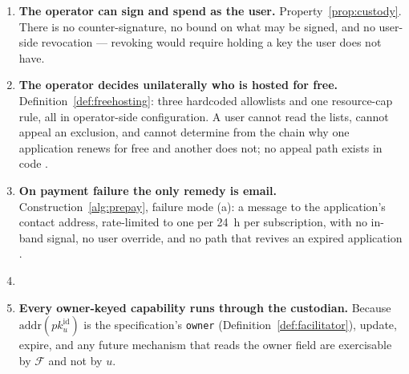 \begin{enumerate}\setlength{\itemsep}{2pt}
\item \textbf{The operator can sign and spend as the user.} Property~\ref{prop:custody}. There is no
counter-signature, no bound on what may be signed, and no user-side revocation --- revoking would
require holding a key the user does not have.

\item \textbf{The operator decides unilaterally who is hosted for free.}
Definition~\ref{def:freehosting}: three hardcoded allowlists and one resource-cap rule, all in
operator-side configuration. A user cannot read the lists, cannot appeal an exclusion, and cannot
determine from the chain why one application renews for free and another does not; no appeal path
exists in code .

\item \textbf{On payment failure the only remedy is email.} Construction~\ref{alg:prepay}, failure
mode (a): a message to the application's contact address, rate-limited to one per \qty{24}{\hour} per
subscription, with no in-band signal, no user override, and no path that revives an expired
application .

\item \textbf{}

\item \textbf{Every owner-keyed capability runs through the custodian.} Because
$\mathrm{addr}(pk^{\mathrm{id}}_u)$ is the specification's \texttt{owner}
(Definition~\ref{def:facilitator}), update, expire, and any future mechanism that reads the owner
field are exercisable by $\mathcal{F}$ and not by $u$.


\end{enumerate}
